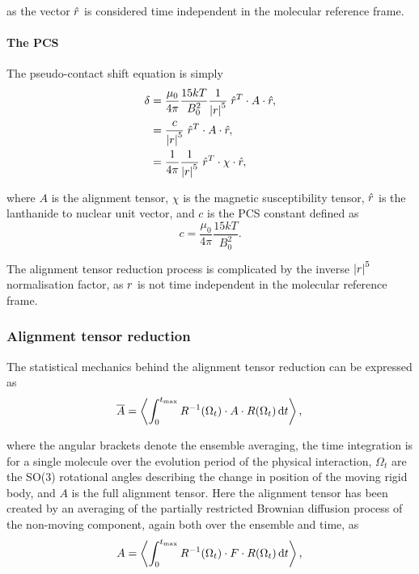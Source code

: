 as the vector $\hat{r}$ is considered time independent in the molecular reference frame.


\paragraph{The PCS}

The pseudo-contact shift equation is simply
\begin{subequations} \label{eq: PCS equation}
\begin{align}
    \delta &= \frac{\mu_0}{4\pi} \frac{15 k T}{B_0^2} \frac{1}{\left| r \right|^5} \; \hat{r}^T \cdot A \cdot \hat{r} , \\
           &= \frac{c}{\left| r \right|^5} \; \hat{r}^T \cdot A \cdot \hat{r} , \\
           &= \frac{1}{4\pi} \frac{1}{\left| r \right|^5} \; \hat{r}^T \cdot \chi \cdot \hat{r} ,
\end{align}
\end{subequations}

where $A$ is the alignment tensor, $\chi$ is the magnetic susceptibility tensor, $\hat{r}$ is the lanthanide to nuclear unit vector, and $c$ is the PCS constant defined as
\begin{equation} \label{eq: PCS constant}
    c = \frac{\mu_0}{4\pi} \frac{15 k T}{B_0^2} .
\end{equation}

The alignment tensor reduction process is complicated by the inverse $\left| r \right|^5$ normalisation factor, as $r$ is not time independent in the molecular reference frame.





\subsubsection{Alignment tensor reduction}

The statistical mechanics behind the alignment tensor reduction can be expressed as
\begin{equation}
    \overline A = \left\langle \int_0^{t_\textrm{max}} R^{-1}(\Omega_t) \cdot A \cdot R(\Omega_t) \,\mathrm{d} t \right\rangle , \\
\end{equation}

where the angular brackets denote the ensemble averaging, the time integration is for a single molecule over the evolution period of the physical interaction, $\Omega_t$ are the SO(3) rotational angles describing the change in position of the moving rigid body, and $A$ is the full alignment tensor.
Here the alignment tensor has been created by an averaging of the partially restricted Brownian diffusion process of the non-moving component, again both over the ensemble and time, as
\begin{equation}
    A = \left\langle \int_0^{t_\textrm{max}} R^{-1}(\Omega_t) \cdot F \cdot R(\Omega_t) \,\mathrm{d} t \right\rangle , \\
\end{equation}

